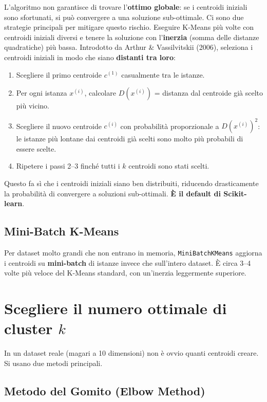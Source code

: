 L'algoritmo non garantisce di trovare l'\textbf{ottimo globale}: se i centroidi iniziali sono sfortunati, si può convergere a una soluzione sub-ottimale. Ci sono due strategie principali per mitigare questo rischio.
Eseguire K-Means più volte con centroidi iniziali diversi e tenere la soluzione con l'\textbf{inerzia} (somma delle distanze quadratiche) più bassa.
Introdotto da Arthur \& Vassilvitskii (2006), seleziona i centroidi iniziali in modo che siano \textbf{distanti tra loro}:

\begin{enumerate}
    \item Scegliere il primo centroide $c^{(1)}$ casualmente tra le istanze.
    \item Per ogni istanza $x^{(i)}$, calcolare $D(x^{(i)})$ = distanza dal centroide già scelto più vicino.
    \item Scegliere il nuovo centroide $c^{(i)}$ con probabilità proporzionale a $D(x^{(i)})^2$: le istanze più lontane dai centroidi già scelti sono molto più probabili di essere scelte.
    \item Ripetere i passi 2--3 finché tutti i $k$ centroidi sono stati scelti.
\end{enumerate}

Questo fa sì che i centroidi iniziali siano ben distribuiti, riducendo drasticamente la probabilità di convergere a soluzioni sub-ottimali. \textbf{È il default di Scikit-learn}.


\subsection{Mini-Batch K-Means}

Per dataset molto grandi che non entrano in memoria, \texttt{MiniBatchKMeans} aggiorna i centroidi su \textbf{mini-batch} di istanze invece che sull'intero dataset. È circa 3--4 volte più veloce del K-Means standard, con un'inerzia leggermente superiore.

\section{Scegliere il numero ottimale di cluster $k$}

In un dataset reale (magari a 10 dimensioni) non è ovvio quanti centroidi creare. Si usano due metodi principali.

\subsection{Metodo del Gomito (Elbow Method)}

